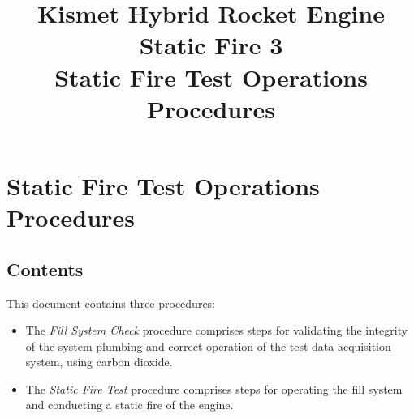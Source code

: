 

\title{
\Huge Kismet Hybrid Rocket Engine\\
Static Fire 3\\
\vspace{1cm}
\Large Static Fire Test Operations Procedures}





\section{Static Fire Test Operations Procedures}

\subsection{Contents}
This document contains three procedures:
\begin{itemize}
    \item The \textit{Fill System Check} procedure comprises steps for validating the integrity of the system plumbing and correct operation of the test data acquisition system, using carbon dioxide.
    \item The \textit{Static Fire Test} procedure comprises steps for operating the fill system and conducting a static fire of the engine.
\end{itemize}

